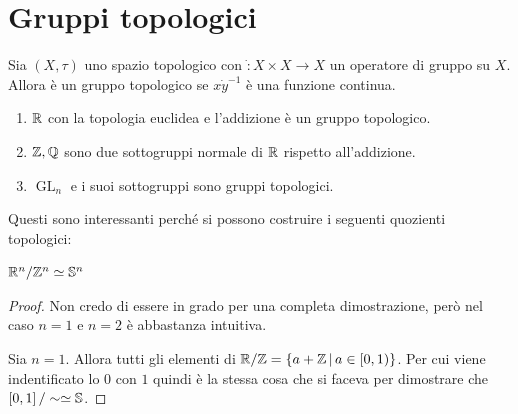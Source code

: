 \section{Gruppi topologici}

\begin{definition}
	Sia $(X, \tau)$ uno spazio topologico con $\dot \colon X \times X \rightarrow X$ un operatore di gruppo su $X$. Allora è un gruppo topologico se $x \dot y^{-1}$ è una funzione continua.
\end{definition}

\begin{example}
\begin{enumerate}
	\item $\R$ con la topologia euclidea e l'addizione è un gruppo topologico.
	\item $\Z, \Q$ sono due sottogruppi normale di $\R$ rispetto all'addizione. 
	\item $\operatorname{GL}_n$ e i suoi sottogruppi sono gruppi topologici.
\end{enumerate}
\end{example}

Questi sono interessanti perché si possono costruire i seguenti quozienti topologici:
\begin{theorem}
	$\R^n / \Z^n \simeq \S^n$
\end{theorem}
\begin{proof}
	Non credo di essere in grado per una completa dimostrazione, però nel caso $n=1$ e $n=2$ è abbastanza intuitiva.
	
	Sia $n=1$. Allora tutti gli elementi di $\R / \Z = \left\{a + \Z \,\middle|\, a \in \left[0,1\right) \right\}$.  
	Per cui viene indentificato lo $0$ con $1$ quindi è la stessa cosa che si faceva per dimostrare che $\left[0,1\right]/ \sim \simeq \S$. 
\end{proof}
